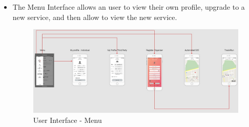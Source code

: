 \begin{itemize}
\item The Menu Interface allows an user to view their own profile, upgrade to a new service, and then allow to view the new service.
\begin{figure}[H]
	\begin{center}
		\includegraphics[width=\textwidth]{./DD_Diagrams/UI_Menu.JPG}
        \caption{User Interface - Menu}
        \label{ui_menu}
	\end{center}
\end{figure}
\end{itemize}

